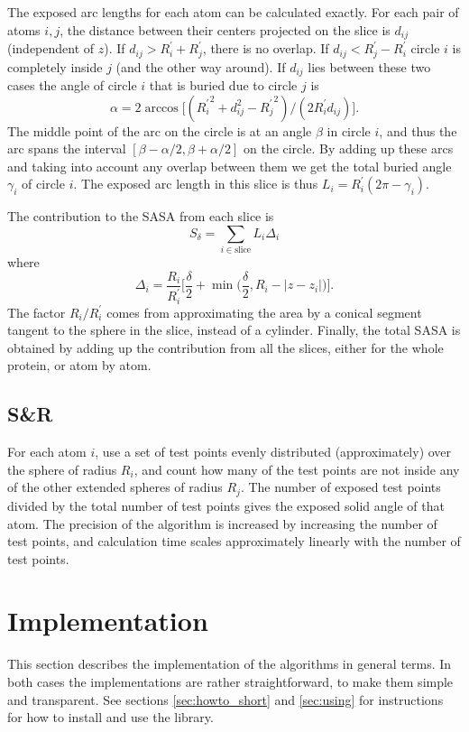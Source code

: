 \documentclass[a4paper,11pt]{article}
\begin{document}
The exposed arc lengths for each atom can be calculated exactly. For
each pair of atoms $i,j$, the distance between their centers projected
on the slice is $d_{ij}$ (independent of $z$). If $d_{ij} > R_i^\prime
+ R_j^\prime$, there is no overlap. If $d_{ij} < R_j^\prime -
R_i^\prime$ circle $i$ is completely inside $j$ (and the other way
around). If $d_{ij}$ lies between these two cases the angle of circle
$i$ that is buried due to circle $j$ is $$\alpha = 2\arccos
\bigl[({R_i^\prime}^2 + d_{ij}^2 - {R_{j}^\prime}^2)/(2R_i^\prime
  d_{ij})\bigr].$$ The middle point of the arc on the circle is at an
angle $\beta$ in circle $i$, and thus the arc spans the interval
$[\beta-\alpha/2,\beta+\alpha/2]$ on the circle. By adding up these
arcs and taking into account any overlap between them we get the total
buried angle $\gamma_i$ of circle $i$. The exposed arc length in this
slice is thus $L_i = R_i^\prime(2\pi-\gamma_i)$.

The contribution to the SASA from each slice is $$ S_\delta =
\sum_{i \in \text{slice}}L_i\Delta_i $$ where
$$
  \Delta_i = \frac{R_i}{R_i^\prime} \biggl[\frac{\delta}{2} 
    + \min\biggl(\frac{\delta}{2},R_i -
    \lvert z - z_i \rvert\biggr)\biggr]. 
$$ 
The factor $R_i/R_i^\prime$ comes from approximating the area by a
conical segment tangent to the sphere in the slice, instead of a
cylinder.  Finally, the total SASA is obtained by adding up the
contribution from all the slices, either for the whole protein, or
atom by atom.

\subsection{S\&R}

For each atom $i$, use a set of test points evenly distributed
(approximately) over the sphere of radius $R_i$, and count how many of
the test points are not inside any of the other extended spheres of
radius $R_j$. The number of exposed test points divided by the total
number of test points gives the exposed solid angle of that atom. The
precision of the algorithm is increased by increasing the number of
test points, and calculation time scales approximately linearly with
the number of test points.


\section{Implementation}\label{sec:imp}

This section describes the implementation of the algorithms in general
terms. In both cases the implementations are rather straightforward,
to make them simple and transparent. See sections
\ref{sec:howto_short} and \ref{sec:using} for instructions for how to
install and use the library.
\end{document}
